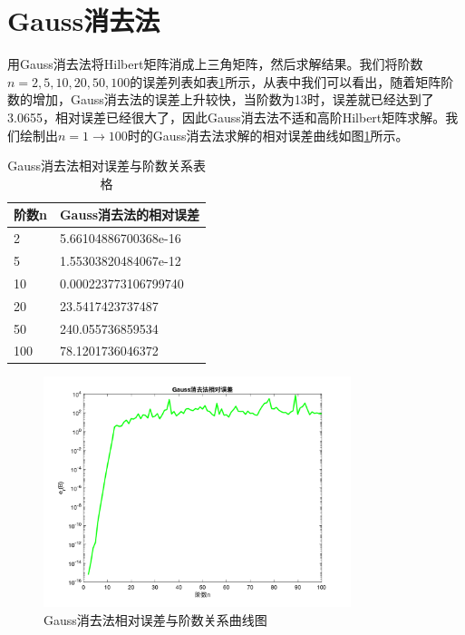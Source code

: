 \documentclass[a4paper]{article}
\begin{document}
\section{Gauss消去法}
用Gauss消去法将Hilbert矩阵消成上三角矩阵，然后求解结果。我们将阶数$n=2,5,10,20,50,100$的误差列表如表\ref{tab:table2}所示，从表中我们可以看出，随着矩阵阶数的增加，Gauss消去法的误差上升较快，当阶数为13时，误差就已经达到了3.0655，相对误差已经很大了，因此Gauss消去法不适和高阶Hilbert矩阵求解。我们绘制出$n=1\to100$时的Gauss消去法求解的相对误差曲线如图\ref{fig:4}所示。

\begin{table}[htbp]
	\centering
	\caption{Gauss消去法相对误差与阶数关系表格}
	\label{tab:table2}
	\begin{tabular}{|p{4cm}<{\centering}|p{6cm}<{\centering}|}
		\hline
		阶数n & Gauss消去法的相对误差 \\
		\hline
		2 & 5.66104886700368e-16 \\
		\hline
		5 & 1.55303820484067e-12 \\
		\hline
		10 & 0.000223773106799740 \\
		\hline
		20 & 23.5417423737487 \\
		\hline
		50 & 240.055736859534 \\
		\hline
		100 & 78.1201736046372 \\
		\hline
	\end{tabular}
\end{table}

\begin{figure}[!h]
	\centering
	\includegraphics[width=0.8\textwidth]{../code/result/gausserror}
	\caption{\label{fig:4}Gauss消去法相对误差与阶数关系曲线图}
\end{figure}
\end{document}

